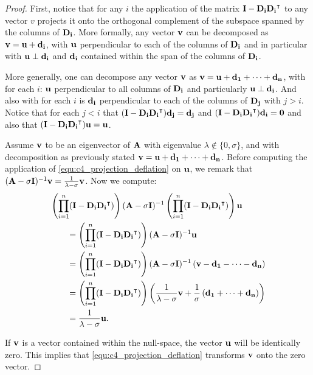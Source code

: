 \begin{proof}
    First, notice that for any $i$ the application of the matrix $\vb{I} - \vb{D_i}{\vb{D_i}}^\intercal$ to any vector $v$ projects it onto the orthogonal complement of the subspace spanned by the columns of $\vb{D_i}$. More formally, any vector $\vb{v}$ can be decomposed as $\vb{v} = \vb{u} + \vb{d_i}$, with $\vb{u}$ perpendicular to each of the columns of $\vb{D_i}$ and in particular with $\vb{u} \perp \vb{d_i}$ and $\vb{d_i}$ contained within the span of the columns of $\vb{D_i}$.

    More generally, one can decompose any vector $\vb{v}$ as $\vb{v} = \vb{u} + \vb{d_1} + \dots + \vb{d_n}$, with for each $i$: $\vb{u}$ perpendicular to all columns of $\vb{D_i}$ and particularly $\vb{u} \perp \vb{d_i}$. And also with for each $i$ is $\vb{d_i}$ perpendicular to each of the columns of $\vb{D_j}$ with $j > i$. Notice that for each $j < i$ that $(\vb{I} - \vb{D_i}{\vb{D_i}}^\intercal)\vb{d_j} = \vb{d_j}$ and $(\vb{I} - \vb{D_i}{\vb{D_i}}^\intercal)\vb{d_i} = \vb{0}$ and also that $(\vb{I} - \vb{D_i}{\vb{D_i}}^\intercal)\vb{u} = \vb{u}$.

    Assume $\vb{v}$ to be an eigenvector of $\vb{A}$ with eigenvalue $\lambda \notin \{0, \sigma\}$, and with decomposition as previously stated $\vb{v} = \vb{u} + \vb{d_1} + \dots + \vb{d_n}$. Before computing the application of \eqref{equ:c4_projection_deflation} on $\vb{u}$, we remark that $(\vb{A}-\sigma \vb{I})^{-1} \vb{v} = \frac{1}{\lambda - \sigma}\vb{v}$. Now we compute:
    \begin{align*}
         & \left(\prod_{i=1}^{n}(\vb{I} - \vb{D_i}{\vb{D_i}}^\intercal)\right) (\vb{A} - \sigma \vb{I})^{-1} \left(\prod_{i=1}^{n}(\vb{I} - \vb{D_i}{\vb{D_i}}^\intercal)\right) \vb{u}          \\
         & \qquad = \left(\prod_{i=1}^{n}(\vb{I} - \vb{D_i}{\vb{D_i}}^\intercal)\right) (\vb{A} - \sigma \vb{I})^{-1} \vb{u}                                                                     \\
         & \qquad = \left(\prod_{i=1}^{n}(\vb{I} - \vb{D_i}{\vb{D_i}}^\intercal)\right) (\vb{A} - \sigma \vb{I})^{-1} \left(\vb{v} - \vb{d_1} - \dots - \vb{d_n}\right)                          \\
         & \qquad = \left(\prod_{i=1}^{n}(\vb{I} - \vb{D_i}{\vb{D_i}}^\intercal)\right) \left(\frac{1}{\lambda - \sigma}\vb{v} + \frac{1}{\sigma}\left(\vb{d_1} + \dots + \vb{d_n}\right)\right) \\
         & \qquad = \frac{1}{\lambda - \sigma}\vb{u} \text{.}
    \end{align*}

    If $\vb{v}$ is a vector contained within the null-space, the vector $\vb{u}$ will be identically zero. This implies that \eqref{equ:c4_projection_deflation} transforms $\vb{v}$ onto the zero vector.
\end{proof}


